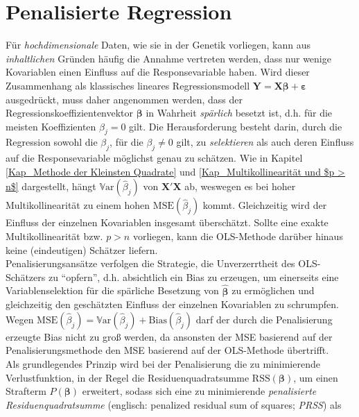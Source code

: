 \documentclass[12pt, a4paper]{report}\usepackage[]{graphicx}\usepackage[]{color}
\begin{document}
\section{Penalisierte Regression}\label{Kap_Penalisierte Regression}
Für \textit{hochdimensionale} Daten, wie sie in der Genetik vorliegen, kann aus \textit{inhaltlichen} Gründen häufig die Annahme vertreten werden, dass nur wenige Kovariablen einen Einfluss auf die Responsevariable haben. Wird dieser Zusammenhang als klassisches lineares Regressionsmodell $\mathbf{Y}=\mathbf{X}\boldsymbol{\beta}+\boldsymbol{\varepsilon}$ ausgedrückt, muss daher angenommen werden, dass der Regressionskoeffizientenvektor $\boldsymbol{\beta}$ in Wahrheit \textit{spärlich} besetzt ist, d.h. für die meisten Koeffizienten $\beta_j = 0$ gilt. Die Herausforderung besteht darin, durch die Regression sowohl die $\beta_j$, für die $\beta_j \neq 0$ gilt, zu \textit{selektieren} als auch deren Einfluss auf die Responsevariable möglichst genau zu schätzen. Wie in Kapitel \ref{Kap_Methode der Kleinsten Quadrate} und \ref{Kap_Multikollinearität und $p > n$} dargestellt, hängt $\mathbb{V}\text{ar}(\hat{\beta}_j)$ von $\mathbf{X}'\mathbf{X}$ ab, weswegen es bei hoher Multikollinearität zu einem hohen $\text{MSE}(\hat{\beta}_j)$ kommt. Gleichzeitig wird der Einfluss der einzelnen Kovariablen insgesamt überschätzt. Sollte eine exakte Multikollinearität bzw. $p > n$ vorliegen, kann die OLS-Methode darüber hinaus keine (eindeutigen) Schätzer liefern.\\
Penalisierungsansätze verfolgen die Strategie, die Unverzerrtheit des OLS-Schätzers zu "`opfern"', d.h. absichtlich ein Bias zu erzeugen, um einerseits eine Variablenselektion für die spärliche Besetzung von $\boldsymbol{\hat{\beta}}$ zu ermöglichen und gleichzeitig den geschätzten Einfluss der einzelnen Kovariablen zu schrumpfen. Wegen $\text{MSE}(\hat{\beta}_j)=\mathbb{V}\text{ar}(\hat{\beta}_j)+ \text{Bias}(\hat{\beta}_j)$ darf der durch die Penalisierung erzeugte Bias nicht zu groß werden, da ansonsten der MSE basierend auf der Penalisierungsmethode den MSE basierend auf der OLS-Methode übertrifft.\\
Als grundlegendes Prinzip wird bei der Penalisierung die zu minimierende Verlustfunktion, in der Regel die Residuenquadratsumme $\text{RSS}(\boldsymbol{\beta})$, um einen Strafterm $P(\boldsymbol{\beta})$ erweitert, sodass sich eine zu minimierende \textit{penalisierte Residuenquadratsumme} (englisch: penalized residual sum of squares; \textit{PRSS}) als  
\end{document}
